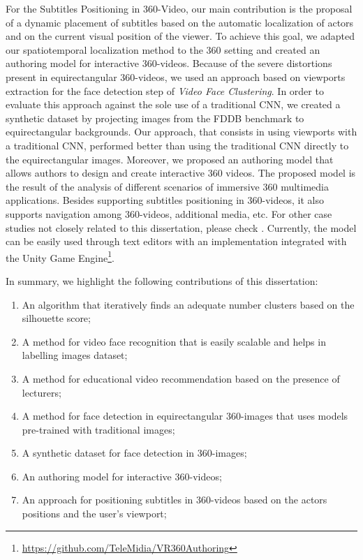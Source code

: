For the Subtitles Positioning in 360-Video, our main contribution is the proposal of a dynamic placement of subtitles based on the automatic localization of actors and on the current visual position of the viewer. To achieve this goal, we adapted our spatiotemporal localization method to the 360 setting and created an authoring model for interactive 360-videos. Because of the severe distortions present in equirectangular 360-videos, we used an approach based on viewports extraction for the face detection step of \emph{Video Face Clustering}. In order to evaluate this approach against the sole use of a traditional CNN, we created a synthetic dataset by projecting images from the FDDB benchmark to equirectangular backgrounds. Our approach, that consists in using viewports with a traditional CNN, performed better than using the traditional CNN directly to the equirectangular images. Moreover, we proposed an authoring model that allows authors to design and create
interactive 360 videos. The proposed model is the result of the analysis of different scenarios of immersive 360 multimedia applications. Besides supporting subtitles positioning in 360-videos, it also supports navigation among 360-videos, additional media, etc. For other case studies not closely related to this dissertation, please check \cite{mendes2020authoring}. Currently, the model can be easily used through text editors with an implementation integrated with the Unity Game Engine\footnote{\url{https://github.com/TeleMidia/VR360Authoring}}.

In summary, we highlight the following contributions of this dissertation:
\begin{enumerate}
    \item An algorithm that iteratively finds an adequate number clusters based on the silhouette score;
    \item A method for video face recognition that is easily scalable and helps in labelling images dataset;
    \item A method for educational video recommendation based on the presence of lecturers;
    \item A method for face detection in equirectangular 360-images that uses models pre-trained with traditional images;
    \item A synthetic dataset for face detection in 360-images;
    \item An authoring model for interactive 360-videos;
    \item An approach for positioning subtitles in 360-videos based on the actors positions and the user's viewport;
\end{enumerate}

